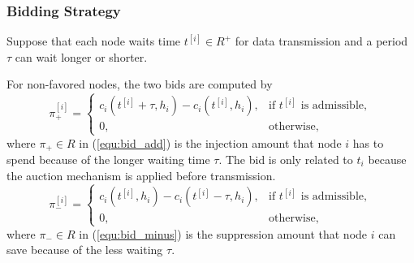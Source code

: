 \documentclass[journal]{IEEEtran}  %
\begin{document}
\subsubsection{Bidding Strategy}
Suppose that each node waits time $t^{[i]} \in R^+$ for data transmission and
a period $\tau$ can wait longer or shorter.

For non-favored nodes, the two bids are computed by
\begin{equation}
\pi_+^{[i]} = \left\{ \begin{array}{ll}
c_i(t^{[i]}+\tau,h_i)- c_i(t^{[i]},h_i), & \text{if $t^{[i]}$ is admissible}, \\
0, & \text{otherwise},
\label{equ:bid_add}
\end{array}\right.
\end{equation}
where $\pi_+ \in R$ in (\ref{equ:bid_add}) is the injection amount that node
$i$ has to spend because of the longer waiting time $\tau$.
The bid is only related to $t_i$ because the auction mechanism is applied
before transmission. 
\begin{equation}
\pi_{-}^{[i]} = \left\{ \begin{array}{ll}
c_i(t^{[i]},h_i)- c_i(t^{[i]}-\tau,h_i), & \text{if $t^{[i]}$ is admissible}, \\
0, & \text{otherwise}, 
\label{equ:bid_minus}
\end{array} \right.
\end{equation}
where $\pi_{-} \in R$ in (\ref{equ:bid_minus}) is the suppression amount that
node $i$ can save because of the less waiting $\tau$. 
%
 
\end{document}
